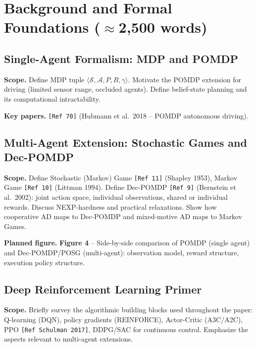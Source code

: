 \documentclass[12pt, a4paper]{article}
\begin{document}
\section{Background and Formal Foundations \textnormal{\small ($\approx$2{,}500 words)}}
\label{sec:background}

\subsection{Single-Agent Formalism: MDP and POMDP}

\begin{outline_note}
\textbf{Scope.}
Define MDP tuple $\langle \mathcal{S}, \mathcal{A}, P, R, \gamma \rangle$.
Motivate the POMDP extension for driving (limited sensor range, occluded
agents).  Define belief-state planning and its computational intractability.

\textbf{Key papers.}
\texttt{[Ref\,70]} (Hubmann et al.\ 2018 -- POMDP autonomous driving).
\end{outline_note}

\subsection{Multi-Agent Extension: Stochastic Games and Dec-POMDP}

\begin{outline_note}
\textbf{Scope.}
Define Stochastic (Markov) Game \texttt{[Ref\,11]} (Shapley 1953),
Markov Game \texttt{[Ref\,10]} (Littman 1994).
Define Dec-POMDP \texttt{[Ref\,9]} (Bernstein et al.\ 2002): joint action space,
individual observations, shared or individual rewards.
Discuss NEXP-hardness and practical relaxations.
Show how cooperative AD maps to Dec-POMDP and mixed-motive AD maps to
Markov Games.

\textbf{Planned figure.}
\textbf{Figure 4} -- Side-by-side comparison of POMDP (single agent) and
Dec-POMDP/POSG (multi-agent): observation model, reward structure,
execution policy structure.
\end{outline_note}

\subsection{Deep Reinforcement Learning Primer}

\begin{outline_note}
\textbf{Scope.}
Briefly survey the algorithmic building blocks used throughout the paper:
Q-learning (DQN), policy gradients (REINFORCE), Actor-Critic (A3C/A2C),
PPO \texttt{[Ref\,Schulman 2017]}, DDPG/SAC for continuous control.
Emphasize the aspects relevant to multi-agent extensions.
\end{outline_note}
\end{document}
